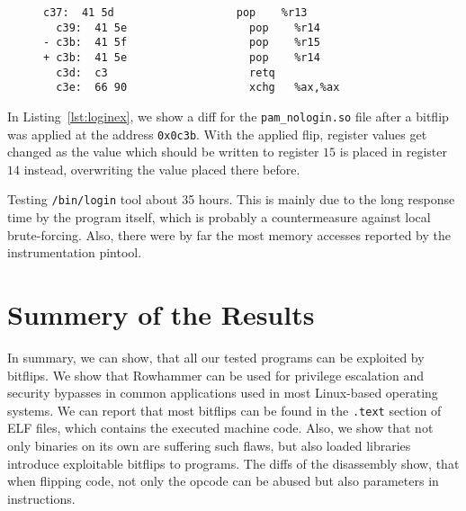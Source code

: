\begin{figure}
\begin{minipage}{\linewidth}
\begin{lstlisting}[style=diff,
                   caption={Diff for a bitflip applied to the
\texttt{pam\_nologin.so} binary in order to bypass a credential check. The
pop to register $15$ gets exchanged with a pop to register $14$, therefore the
value of \texttt{r15} and \texttt{r14} are not as desired and hence the
execution path of \texttt{/bin/login} changes in a way the login
procedure succeeds.},
label=lst:loginex]
  c37:  41 5d                   pop    %r13
  c39:  41 5e                   pop    %r14
- c3b:  41 5f                   pop    %r15
+ c3b:  41 5e                   pop    %r14
  c3d:  c3                      retq
  c3e:  66 90                   xchg   %ax,%ax
\end{lstlisting}
\end{minipage}
\end{figure}

In Listing~\ref{lst:loginex}, we show a diff for the \texttt{pam\_nologin.so}
file after a bitflip was applied at the address \texttt{0x0c3b}. With
the applied flip, register values get changed as the value which should be
written to register $15$ is placed in register $14$ instead, overwriting the
value placed there before.

Testing \texttt{/bin/login} tool about 35 hours. This is mainly due to the long
response time by the program itself, which is probably a countermeasure against
local brute-forcing. Also, there were by far the most memory accesses reported
by the instrumentation pintool.

\section{Summery of the Results}

In summary, we can show, that all our tested programs can be exploited by
bitflips. We show that Rowhammer can be used for privilege escalation and
security bypasses in common applications used in most Linux-based operating
systems. We can report that most bitflips can be found in the \texttt{.text}
section of ELF files, which contains the executed machine code. Also, we show
that not only binaries on its own are suffering such flaws, but also loaded
libraries introduce exploitable bitflips to programs. The diffs of the
disassembly show, that when flipping code, not only the opcode can be abused but
also parameters in instructions.

